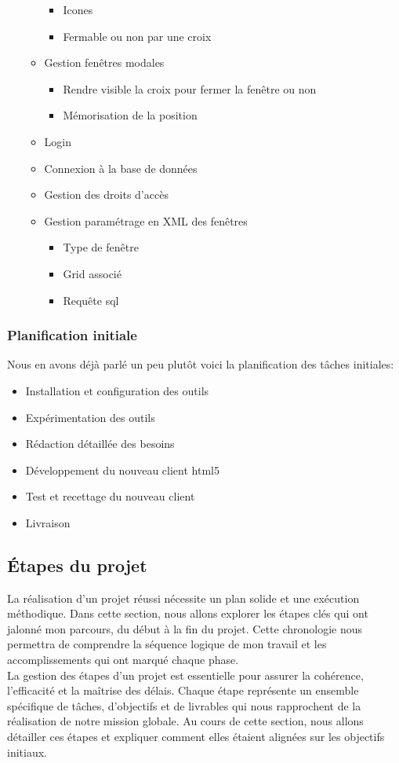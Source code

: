 \documentclass[a4paper, 12pt, french]{article}
\newcommand{\bdot}{\item[\color{ssiYellow}\ding{108}]}
\newcommand{\bdotoutlined}{\item[\color{ssiYellow}\ding{109}]}
\newcommand{\bsquare}{\item[\color{ssiYellow}\ding{110}]}
\begin{document}
\begin{itemize}
\begin{itemize}
									\begin{itemize}
										\bsquare{Icones}
										\bsquare{Fermable ou non par une croix}
									\end{itemize}
								\bdotoutlined{Gestion fenêtres modales}
									\begin{itemize}
										\bsquare{Rendre visible la croix pour fermer la fenêtre ou non}
										\bsquare{Mémorisation de la position}
									\end{itemize}
								\bdotoutlined{Login}
								\bdotoutlined{Connexion à la base de données}
								\bdotoutlined{Gestion des droits d'accès}
								\bdotoutlined{Gestion paramétrage en \gls{XML} des fenêtres}
									\begin{itemize}
										\bsquare{Type de fenêtre}
										\bsquare{Grid associé}
										\bsquare{Requête sql}
									\end{itemize}
							\end{itemize}
					\end{itemize}

				\subsubsection{Planification initiale}
					Nous en avons déjà parlé un peu plutôt voici la planification des tâches initiales:
					\begin{itemize}
						\bdot{Installation et configuration des outils}
						\bdot{Expérimentation des outils}
						\bdot{Rédaction détaillée des besoins}
						\bdot{Développement du nouveau client \gls{html}5}
						\bdot{Test et recettage du nouveau client}
						\bdot{Livraison}
					\end{itemize}
						
			\subsection{Étapes du projet}
				La réalisation d'un projet réussi nécessite un plan solide et une exécution méthodique. Dans cette section, nous allons explorer les étapes clés qui ont jalonné mon parcours, du début à la fin du projet. Cette chronologie nous permettra de comprendre la séquence logique de mon travail et les accomplissements qui ont marqué chaque phase.\\

				La gestion des étapes d'un projet est essentielle pour assurer la cohérence, l'efficacité et la maîtrise des délais. Chaque étape représente un ensemble spécifique de tâches, d'objectifs et de livrables qui nous rapprochent de la réalisation de notre mission globale. Au cours de cette section, nous allons détailler ces étapes et expliquer comment elles étaient alignées sur les objectifs initiaux.
\end{document}
